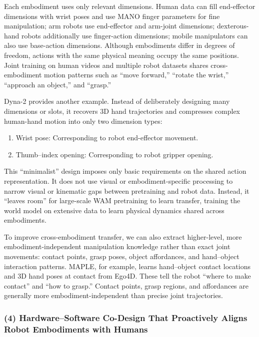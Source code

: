 Each embodiment uses only relevant dimensions. Human data can fill end-effector dimensions with wrist poses and use MANO finger parameters for fine manipulation; arm robots use end-effector and arm-joint dimensions; dexterous-hand robots additionally use finger-action dimensions; mobile manipulators can also use base-action dimensions. Although embodiments differ in degrees of freedom, actions with the same physical meaning occupy the same positions. Joint training on human videos and multiple robot datasets shares cross-embodiment motion patterns such as ``move forward,'' ``rotate the wrist,'' ``approach an object,'' and ``grasp.''

Dyna-2 provides another example. Instead of deliberately designing many dimensions or slots, it recovers 3D hand trajectories and compresses complex human-hand motion into only two dimension types:

\begin{enumerate}
\def\labelenumi{\arabic{enumi}.}
\item
  Wrist pose: Corresponding to robot end-effector movement.
\item
  Thumb--index opening: Corresponding to robot gripper opening.
\end{enumerate}

This ``minimalist'' design imposes only basic requirements on the shared action representation. It does not use visual or embodiment-specific processing to narrow visual or kinematic gaps between pretraining and robot data. Instead, it ``leaves room'' for large-scale WAM pretraining to learn transfer, training the world model on extensive data to learn physical dynamics shared across embodiments.

To improve cross-embodiment transfer, we can also extract higher-level, more embodiment-independent manipulation knowledge rather than exact joint movements: contact points, grasp poses, object affordances, and hand--object interaction patterns. MAPLE, for example, learns hand--object contact locations and 3D hand poses at contact from Ego4D. These tell the robot ``where to make contact'' and ``how to grasp.'' Contact points, grasp regions, and affordances are generally more embodiment-independent than precise joint trajectories.

\hypertarget{hardwaresoftware-co-design-that-proactively-aligns-robot-embodiments-with-humans}{%
\subsubsection{(4) Hardware--Software Co-Design That Proactively Aligns Robot Embodiments with Humans}\label{hardwaresoftware-co-design-that-proactively-aligns-robot-embodiments-with-humans}}

